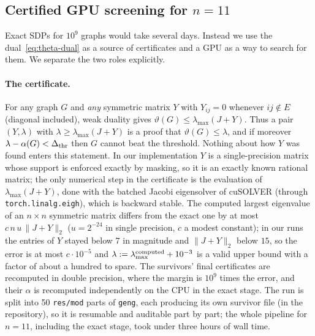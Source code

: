 \documentclass[11pt]{article}
\renewcommand{\theta}{\vartheta}
\newcommand{\gap}{\Delta}
\begin{document}
\subsection{Certified GPU screening for $n=11$}\label{sec:screen}
Exact SDPs for $10^9$ graphs would take several days. Instead we use the dual~\eqref{eq:theta-dual} as a source of certificates and a GPU as a way to search for them. We separate the two roles explicitly.

\paragraph{The certificate.} For any graph $G$ and \emph{any} symmetric matrix $Y$ with $Y_{ij}=0$ whenever $ij\notin E$ (diagonal included), weak duality gives $\theta(G)\le\lambda_{\max}(J+Y)$. Thus a pair $(Y,\lambda)$ with $\lambda\ge\lambda_{\max}(J+Y)$ is a proof that $\theta(G)\le\lambda$, and if moreover $\lambda-\alpha(G)<\gap_{\rm thr}$ then $G$ cannot beat the threshold. Nothing about how $Y$ was found enters this statement. In our implementation $Y$ is a single-precision matrix whose support is enforced exactly by masking, so it is an exactly known rational matrix; the only numerical step in the certificate is the evaluation of $\lambda_{\max}(J+Y)$, done with the batched Jacobi eigensolver of cuSOLVER (through \texttt{torch.linalg.eigh}), which is backward stable. The computed largest eigenvalue of an $n\times n$ symmetric matrix differs from the exact one by at most $c\,n\,u\,\|J+Y\|_2$ ($u=2^{-24}$ in single precision, $c$ a modest constant); in our runs the entries of $Y$ stayed below $7$ in magnitude and $\|J+Y\|_2$ below $15$, so the error is at most $c\cdot10^{-5}$ and $\lambda:=\lambda_{\max}^{\rm computed}+10^{-3}$ is a valid upper bound with a factor of about a hundred to spare. The survivors' final certificates are recomputed in double precision, where the margin is $10^{9}$ times the error, and their $\alpha$ is recomputed independently on the CPU in the exact stage. The run is split into 50 \texttt{res/mod} parts of \texttt{geng}, each producing its own survivor file (in the repository), so it is resumable and auditable part by part; the whole pipeline for $n=11$, including the exact stage, took under three hours of wall time.
\end{document}
